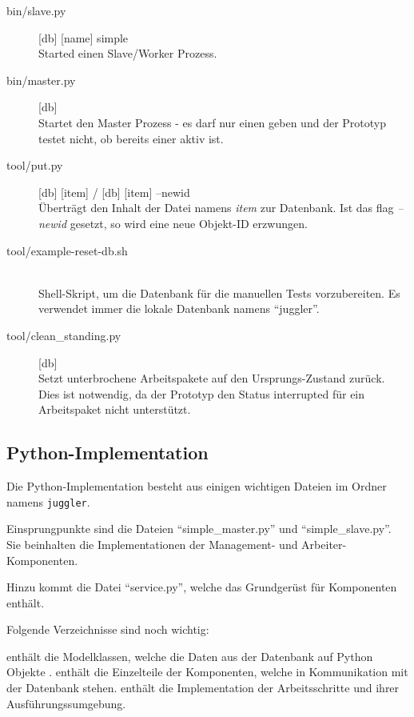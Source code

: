 \begin{description}
    \item[bin/slave.py] [db] [name] simple \hfill \\
        Started einen Slave/Worker Prozess.
    \item[bin/master.py] [db] \hfill \\
        Startet den Master Prozess - es darf nur einen geben und der Prototyp testet nicht, ob bereits einer aktiv ist.
    \item[tool/put.py] [db] [item] / [db] [item] --newid \hfill \\
        Überträgt den Inhalt der Datei namens \textit{item} zur Datenbank.
        Ist das flag \textit{--newid} gesetzt, so wird eine neue Objekt-ID erzwungen.
    \item[tool/example-reset-db.sh] \hfill \\
        Shell-Skript, um die Datenbank für die manuellen Tests vorzubereiten.
        Es verwendet immer die lokale Datenbank namens ``juggler''.
    \item[tool/clean\_standing.py] [db]\hfill \\
        Setzt unterbrochene Arbeitspakete auf den Ursprungs-Zustand zurück.
        Dies ist notwendig, da der Prototyp den Status interrupted für ein Arbeitspaket nicht unterstützt.
\end{description}

\subsection{Python-Implementation}

Die Python-Implementation besteht aus einigen wichtigen Dateien im Ordner namens \verb|juggler|.

Einsprungpunkte sind die Dateien ``simple\_master.py'' und ``simple\_slave.py''.
Sie beinhalten die Implementationen der Management- und Arbeiter-Komponenten.

Hinzu kommt die Datei ``service.py'', welche das Grundgerüst für Komponenten enthält.

Folgende Verzeichnisse sind noch wichtig:

\begin{description}
    \dhitem[model] 
        enthält  die Modelklassen,
        welche die Daten aus der Datenbank auf Python Objekte .
    \dhitem[handler] 
        enthält die Einzelteile der Komponenten,
        welche in Kommunikation mit der Datenbank stehen.
    \dhitem[process]
        enthält die Implementation der Arbeitsschritte
        und ihrer Ausführungssumgebung.
\end{description}



